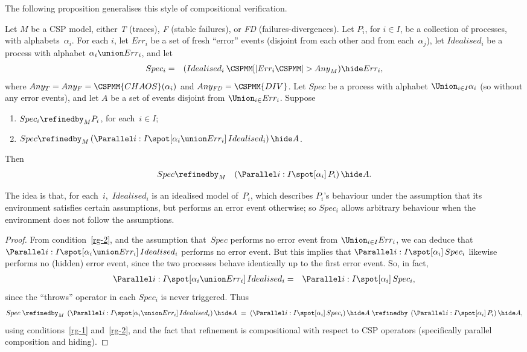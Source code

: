 The following proposition generalises this style of compositional
verification. 
%
\begin{prop}
\label{prop:rely-guarantee}
Let $M$ be a CSP model, either {\it T} (traces), {\it F} (stable failures), or
{\it FD} (failures-divergences).  Let $P_i$, for $i \in I$, be a collection of
processes, with alphabets~$\alpha_i$.  For each $i$, let $Err_i$ be a set of
fresh ``error'' events (disjoint from each other and from each~$\alpha_j$),
let $Idealised_i$ be a process with alphabet $\alpha_i \union Err_i$, and let
\begin{eqnarray*}
Spec_i & = & (Idealised_i \throw{Err_i} {Any}_M) \hide Err_i,
\end{eqnarray*} 
where $Any_T = Any_F = \CSPMM{CHAOS}(\alpha_i)$ and $Any_{\it FD} =
\CSPMM{DIV}$.
%
Let $Spec$ be a process with alphabet $\Union_{i \in I} \alpha_i$ (so without
any error events), and let $A$ be a set of events disjoint from $\Union_{i \in
} Err_i$.  Suppose
\begin{enumerate}
\item\label{rg-1} $Spec_i \refinedby_M P_i$, for each~$i \in I$;

\item\label{rg-2} $Spec \refinedby_M 
 \left( \Parallel i:I \spot [\alpha_i \union Err_i] \, Idealised_i \right)
 \hide A$. 
\end{enumerate}
Then
\begin{eqnarray*}
Spec & \refinedby_M & 
  \left( \Parallel i:I \spot [\alpha_i] \, P_i \right) \hide A.
\end{eqnarray*}
\end{prop}
%
The idea is that, for each~$i$,\, $Idealised_i$ is an idealised model
of~$P_i$, which describes $P_i$'s behaviour under the assumption that its
environment satisfies certain assumptions, but performs an error event
otherwise; so $Spec_i$ allows arbitrary behaviour when the environment does
not follow the assumptions.

\begin{proof}
From condition~\ref{rg-2}, and the assumption that~$Spec$ performs no error
event from $\Union_{i \in I} Err_i$, we can deduce that $\Parallel i:I \spot
[\alpha_i \union Err_i] \, Idealised_i$ performs no error event.  But this
implies that $\Parallel i:I \spot [\alpha_i] \, Spec_i$ likewise performs no
(hidden) error event, since the two processes behave identically up to the
first error event.  So, in fact,
\begin{eqnarray*}
\Parallel i:I \spot [\alpha_i \union Err_i] \, Idealised_i & = & 
  \Parallel i:I \spot [\alpha_i] \, Spec_i,
\end{eqnarray*}
since the ``throws'' operator in each $Spec_i$ is never triggered.  Thus
\[
Spec  \;\refinedby_M\; 
  \left( \Parallel i:I \spot [\alpha_i \union Err_i] \, Idealised_i \right)
    \hide A
  \; = \; 
  \left(  \Parallel i:I \spot [\alpha_i] \, Spec_i \right) \hide A
  \;\refinedby\; 
  \left( \Parallel i:I \spot [\alpha_i] \, P_i \right) \hide A,
\]
using conditions~\ref{rg-1} and~\ref{rg-2}, and the fact that refinement is
compositional with respect to CSP operators (specifically parallel composition
and hiding).
\end{proof}


